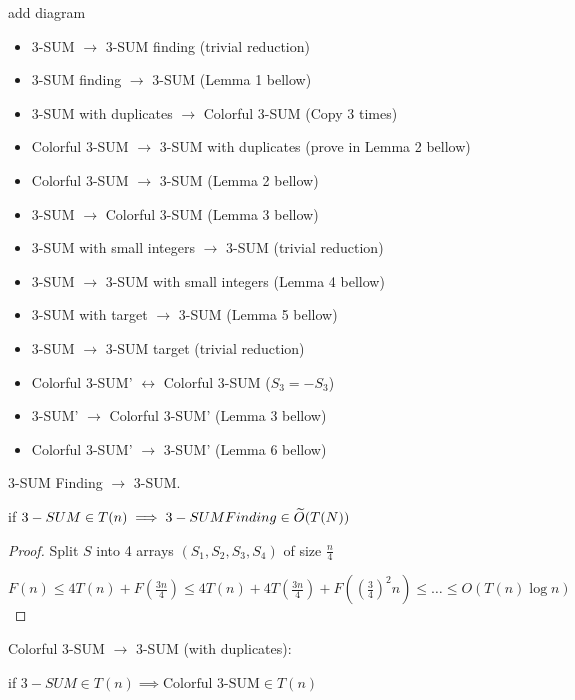 {\color{red} add diagram}

\begin{itemize}
	\item 3-SUM $\to$ 3-SUM finding (trivial reduction)
	\item 3-SUM finding $\to$ 3-SUM (Lemma 1 bellow)

	\item 3-SUM with duplicates $\to$ Colorful 3-SUM (Copy 3 times)
	\item Colorful 3-SUM $\to$ 3-SUM with duplicates (prove in Lemma 2 bellow)

	\item Colorful 3-SUM $\to$ 3-SUM (Lemma 2 bellow)
	\item 3-SUM $\to$ Colorful 3-SUM (Lemma 3 bellow)

	\item 3-SUM with small integers $\to$ 3-SUM (trivial reduction)
	\item 3-SUM $\to$ 3-SUM with small integers (Lemma 4 bellow)

	\item 3-SUM with target $\to$ 3-SUM (Lemma 5 bellow)
	\item 3-SUM $\to$ 3-SUM target (trivial reduction)

	\item Colorful 3-SUM' $\longleftrightarrow$ Colorful 3-SUM ($S_3 = -S_3$)

	\item 3-SUM' $\to$ Colorful 3-SUM' (Lemma 3 bellow)
	\item Colorful 3-SUM' $\to$ 3-SUM' (Lemma 6 bellow)
\end{itemize}

\begin{lm}
	3-SUM Finding $\to$ 3-SUM.

	if $3-SUM \in T(n) \implies 3-SUM Finding \in \widetilde{O}(T(N))$
\end{lm}

\begin{proof}
	Split $S $ into 4 arrays $(S_1, S_2, S_3, S_4)$  of size $\frac{n}{4}$

	$F(n) \le 4 T(n) + F(\frac{3n}{4}) \le 4 T(n) + 4T(\frac{3n}{4}) + F((\frac{3}{4})^2 n) \le \ldots \le O(T(n) \log n)$
\end{proof}

\begin{lm}
	Colorful 3-SUM $\to$ 3-SUM (with duplicates):

	if $3-SUM \in T(n) \implies \text{Colorful 3-SUM} \in T(n)$
\end{lm}


